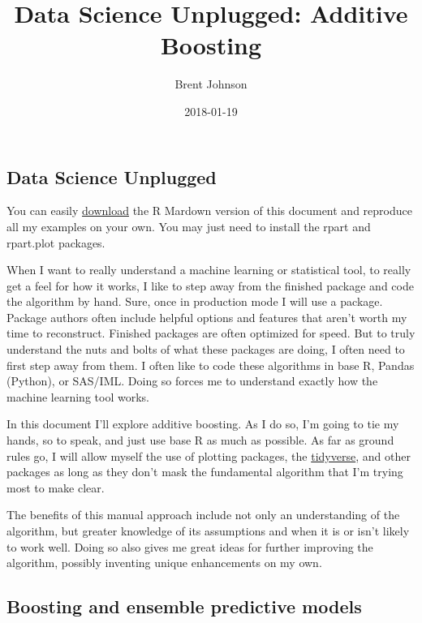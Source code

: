 \documentclass[]{tufte-handout}
\title{Data Science Unplugged: Additive Boosting}
\author{Brent Johnson}
\date{2018-01-19}
\begin{document}
\maketitle




\subsection{Data Science Unplugged}\label{data-science-unplugged}

\begin{marginfigure}
You can easily \href{http://www.centralmoment.com}{download} the R
Mardown version of this document and reproduce all my examples on your
own. You may just need to install the rpart and rpart.plot packages.
\end{marginfigure}

When I want to really understand a machine learning or statistical tool,
to really get a feel for how it works, I like to step away from the
finished package and code the algorithm by hand. Sure, once in
production mode I will use a package. Package authors often include
helpful options and features that aren't worth my time to reconstruct.
Finished packages are often optimized for speed. But to truly understand
the nuts and bolts of what these packages are doing, I often need to
first step away from them. I often like to code these algorithms in base
R, Pandas (Python), or SAS/IML. Doing so forces me to understand exactly
how the machine learning tool works.

In this document I'll explore additive boosting. As I do so, I'm going
to tie my hands, so to speak, and just use base R as much as possible.
As far as ground rules go, I will allow myself the use of plotting
packages, the \href{https://www.tidyverse.org/}{tidyverse}, and other
packages as long as they don't mask the fundamental algorithm that I'm
trying most to make clear.

The benefits of this manual approach include not only an understanding
of the algorithm, but greater knowledge of its assumptions and when it
is or isn't likely to work well. Doing so also gives me great ideas for
further improving the algorithm, possibly inventing unique enhancements
on my own.

\subsection{Boosting and ensemble predictive
models}\label{boosting-and-ensemble-predictive-models}
\end{document}
